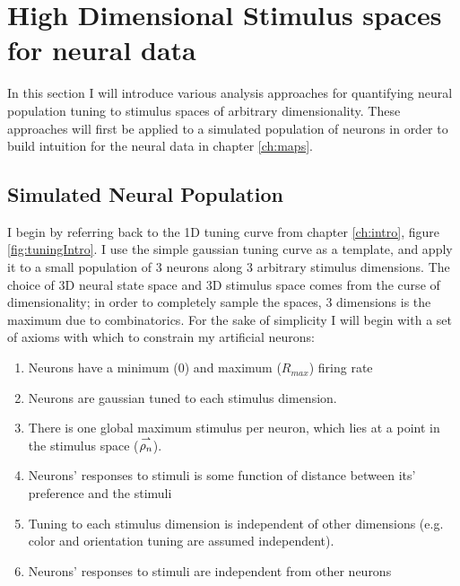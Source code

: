
\chapter{\color{thesisBlue} High Dimensional Stimulus spaces for neural data} %

\label{ch:optim} %


\newcommand{\keyword}[1]{\textbf{#1}}


In this section I will introduce various analysis approaches for quantifying neural population tuning to stimulus spaces of arbitrary dimensionality. These approaches will first be applied to a simulated population of neurons in order to build intuition for the neural data in chapter \ref{ch:maps}.




\section*{\color{sectionBlue} Simulated Neural Population}
I begin by referring back to the 1D tuning curve from chapter \ref{ch:intro}, figure \ref{fig:tuningIntro}. I use the simple gaussian tuning curve as a template, and apply it to a small population of 3 neurons along 3 arbitrary stimulus dimensions. The choice of 3D neural state space and 3D stimulus space comes from the curse of dimensionality; in order to completely sample the spaces, 3 dimensions is the maximum due to combinatorics. For the sake of simplicity I will begin with a set of axioms with which to constrain my artificial neurons:

\begin{enumerate}
	\item \label{ax:bounds} Neurons have a minimum ($0$) and maximum ($R_{max}$) firing rate 
	\item \label{ax:gauss} Neurons are gaussian tuned to each stimulus dimension.
	\item There is one global maximum stimulus per neuron, which lies at a point in the stimulus space ($\overset{\rightharpoonup}{\rho_n}$).
	\item \label{ax:distfx} Neurons' responses to stimuli is some function of distance between its' preference and the stimuli
	\item Tuning to each stimulus dimension is independent of other dimensions (e.g. color and orientation tuning are assumed independent).
	\item \label{ax:nocorr} Neurons' responses to stimuli are independent from other neurons
\end{enumerate}


